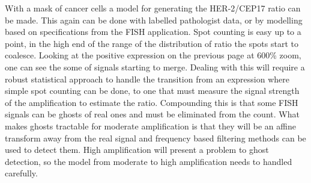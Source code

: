 \documentclass[10pt]{amsart}
\theoremstyle{definition}
\theoremstyle{remark}
\numberwithin{equation}{section}
\begin{document}
With a mask of cancer cells a model for generating the HER-2/CEP17
ratio can be made.  This again can be done with labelled
pathologist data, or by modelling based on specifications from the
FISH application.  Spot counting is easy up to a point, in the
high end of the range of the distribution of ratio the spots start
to coalesce. Looking at the positive expression on the previous
page at 600\% zoom, one can see the some of signals starting to
merge. Dealing with this will require a robust statistical
approach to handle the transition from an expression where simple
spot counting can be done, to one that must measure the signal
strength of the amplification to estimate the ratio. Compounding
this is that some FISH signals can be ghosts of real ones and must
be eliminated from the count. What makes ghosts tractable for
moderate amplification is that they will be an affine transform
away from the real signal and frequency based filtering methods
can be used to detect them.  High amplification will present a
problem to ghost detection, so the model from moderate to high
amplification needs to handled carefully.





%
%
%
%
\end{document}
